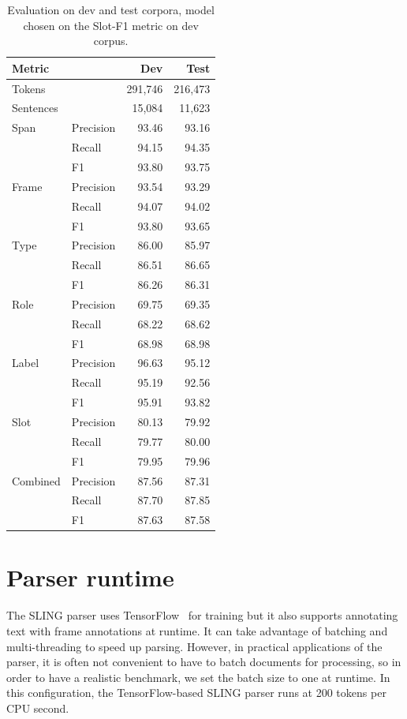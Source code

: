 \documentclass[11pt,a4paper]{article}
\begin{document}
\begin{table}[ht]
\begin{tabular}{|ll|r|r|}
\hline
{\bf Metric} & & {\bf Dev} & {\bf Test} \\
\hline
Tokens & & 291,746  & 216,473  \\
\hline
Sentences &   & 15,084 & 11,623  \\
\hline
\hline
Span & Precision & 93.46  & 93.16 \\
\hline
& Recall & 94.15 & 94.35 \\
\hline
& F1 & 93.80 & 93.75 \\
\hline
Frame & Precision & 93.54 & 93.29 \\
\hline
& Recall & 94.07 & 94.02 \\
\hline
& F1 & 93.80 & 93.65\\
\hline
Type & Precision & 86.00  & 85.97 \\
\hline
& Recall & 86.51 & 86.65 \\
\hline
& F1 & 86.26 & 86.31 \\
\hline
Role & Precision & 69.75 & 69.35 \\
\hline
& Recall & 68.22 & 68.62 \\
\hline
& F1 & 68.98 &68.98 \\
\hline
Label & Precision & 96.63 &95.12 \\
\hline
& Recall & 95.19 & 92.56 \\
\hline
& F1 & 95.91 & 93.82 \\
\hline
Slot & Precision & 80.13 & 79.92 \\
\hline
& Recall & 79.77 & 80.00 \\
\hline
& F1 & 79.95 & 79.96 \\
\hline
Combined & Precision & 87.56 & 87.31 \\
\hline
& Recall & 87.70 & 87.85 \\
\hline
& F1 & 87.63 & 87.58 \\
\hline
\end{tabular}
\caption{Evaluation on dev and test corpora, model 
chosen on the Slot-F1 metric on dev corpus.}
\label{tab:eval}
\end{table}


\section{Parser runtime}

The SLING parser uses TensorFlow~\cite{tensorflow} for training but it also
supports annotating text with frame annotations at runtime. It can take
advantage of batching and multi-threading to speed up parsing. However, in
practical applications of the parser, it is often not convenient to have to
batch documents for processing, so in order to have a realistic benchmark, we
set the batch size to one at runtime. In this configuration, the
TensorFlow-based SLING parser runs at 200 tokens per CPU second.
\end{document}
